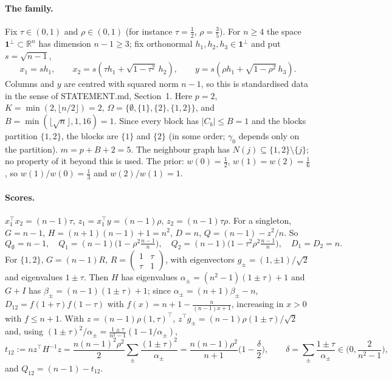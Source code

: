 \documentclass[11pt]{article}
\theoremstyle{remark}
\newcommand{\Om}{\Omega}
\begin{document}
\paragraph{The family.} Fix $\tau\in(0,1)$ and $\rho\in(0,1)$ (for instance $\tau=\tfrac12$, $\rho=\tfrac35$). For $n\ge4$ the space $\mathbf 1^\perp\subset\mathbb R^n$ has dimension $n-1\ge3$; fix orthonormal $h_1,h_2,h_3\in\mathbf 1^\perp$ and put $s=\sqrt{n-1}$,
\[x_1=s h_1,\qquad x_2=s(\tau h_1+\sqrt{1-\tau^2}\,h_2),\qquad y=s(\rho h_1+\sqrt{1-\rho^2}\,h_3).\]
Columns and $y$ are centred with squared norm $n-1$, so this is standardised data in the sense of STATEMENT.md, Section~1. Here $p=2$, $K=\min(2,\lfloor n/2\rfloor)=2$, $\Om=\{\emptyset,\{1\},\{2\},\{1,2\}\}$, and $B=\min(\lfloor\sqrt n\rfloor,1,16)=1$. Since every block has $|C_b|\le B=1$ and the blocks partition $\{1,2\}$, the blocks are $\{1\}$ and $\{2\}$ (in some order; $\gamma_0$ depends only on the partition). $m=p+B+2=5$. The neighbour graph has $N(j)\subseteq\{1,2\}\setminus\{j\}$; no property of it beyond this is used. The prior: $w(0)=\tfrac12$, $w(1)=w(2)=\tfrac16$, so $w(1)/w(0)=\tfrac13$ and $w(2)/w(1)=1$.

\paragraph{Scores.} $x_1^\top x_2=(n-1)\tau$, $z_1=x_1^\top y=(n-1)\rho$, $z_2=(n-1)\tau\rho$. For a singleton, $G=n-1$, $H=(n+1)(n-1)+1=n^2$, $D=n$, $Q=(n-1)-z^2/n$. So
\[Q_\emptyset=n-1,\quad Q_1=(n-1)\Big(1-\rho^2\tfrac{n-1}{n}\Big),\quad Q_2=(n-1)\Big(1-\tau^2\rho^2\tfrac{n-1}{n}\Big),\quad D_1=D_2=n.\]
For $\{1,2\}$, $G=(n-1)R$, $R=\begin{pmatrix}1&\tau\\\tau&1\end{pmatrix}$, with eigenvectors $g_\pm=(1,\pm1)/\sqrt2$ and eigenvalues $1\pm\tau$. Then $H$ has eigenvalues $\alpha_\pm=(n^2-1)(1\pm\tau)+1$ and $G+I$ has $\beta_\pm=(n-1)(1\pm\tau)+1$; since $\alpha_\pm=(n+1)\beta_\pm-n$, $D_{12}=f(1+\tau)f(1-\tau)$ with $f(x)=n+1-\frac{n}{(n-1)x+1}$, increasing in $x>0$ with $f\le n+1$. With $z=(n-1)\rho(1,\tau)^\top$, $z^\top g_\pm=(n-1)\rho(1\pm\tau)/\sqrt2$ and, using $(1\pm\tau)^2/\alpha_\pm=\frac{1\pm\tau}{n^2-1}(1-1/\alpha_\pm)$,
\[t_{12}:=n z^\top H^{-1}z=\frac{n(n-1)^2\rho^2}{2}\sum_\pm\frac{(1\pm\tau)^2}{\alpha_\pm}=\frac{n(n-1)\rho^2}{n+1}\Big(1-\frac\delta2\Big),\qquad \delta=\sum_\pm\frac{1\pm\tau}{\alpha_\pm}\in\Big(0,\frac2{n^2-1}\Big),\]
and $Q_{12}=(n-1)-t_{12}$.
\end{document}
